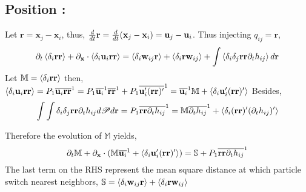 \subsection*{Position :}
Let $\textbf{r} = \textbf{x}_j - \textbf{x}_i$, thus, 
$\frac{d}{d t} \textbf{r} = \frac{d}{d t} (\textbf{x}_j - \textbf{x}_i) = \textbf{u}_j - \textbf{u}_i$. 
Thus injecting $q_{ij} =\textbf{r}$, 
\begin{equation*}
    \partial_t \left<\delta_i \textbf{r}\textbf{r}\right> 
  + \partial_\textbf{x} \cdot \left<\delta_i\textbf{u}_i \textbf{r} \textbf{r}\right>
  = \left<\delta_i\textbf{w}_{ij} \textbf{r}\right>
  + \left<\delta_i\textbf{r} \textbf{w}_{ij}\right> 
  + \int \left<\delta_i\delta_{j} \textbf{r}\textbf{r}\partial_t h_{ij} \right> d\textbf{r}
\end{equation*}
Let $\mathbb{M} = \left<\delta_i \textbf{r}\textbf{r}\right>$ then, 
$\left<\delta_i\textbf{u}_i \textbf{r} \textbf{r}\right> 
= P_1\overline{\textbf{u}_i \textbf{r} \textbf{r}}^{1} 
= P_1\overline{\textbf{u}_i}^{1} \overline{\textbf{r} \textbf{r}}^{1} 
+ P_1\overline{\textbf{u}_i' (\textbf{r} \textbf{r})'}^{1}
=\overline{\textbf{u}_i}^{1} \mathbb{M} 
+ \left<\delta_i\textbf{u}_i' (\textbf{r} \textbf{r})'\right>$
Besides, 
\begin{equation*}
    \int \int\delta_i\delta_{j} \textbf{r}\textbf{r}\partial_t h_{ij} d\mathscr{P} d\textbf{r}
    =P_1\overline{\textbf{r}\textbf{r}\partial_t h_{ij}}^{1}
    = \mathbb{M}\overline{\partial_t h_{ij}}^{1}
    +\left<\delta_i(\textbf{r}\textbf{r})'(\partial_t h_{ij})'\right>
\end{equation*}

Therefore the evolution of $\mathbb{M}$ yields, 
\begin{equation*}
    \partial_t \mathbb{M} 
  + \partial_\textbf{x} \cdot (\mathbb{M} \overline{\textbf{u}_i}^{1}
  + \left<\delta_i\textbf{u}_i' (\textbf{r} \textbf{r})'\right>)
  = 
   \mathbb{S}
  + P_1\overline{\textbf{r}\textbf{r}\partial_t h_{ij}}^{1}
\end{equation*}
The last term on the RHS represent the mean square distance at which particle switch nearest neighbors, $\mathbb{S} = \left<\delta_i\textbf{w}_{ij} \textbf{r}\right>
+ \left<\delta_i\textbf{r} \textbf{w}_{ij}\right> $



